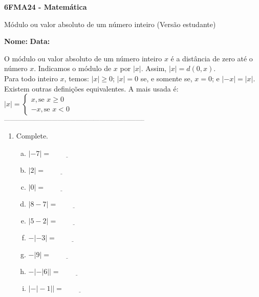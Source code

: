 \documentclass[a4paper,14pt]{article}
\begin{document}
	
	\noindent\textbf{6FMA24 - Matemática} 
	
	\begin{center}Módulo ou valor absoluto de um número inteiro (Versão estudante)
	\end{center}
	
	\noindent\textbf{Nome:} \underline{\hspace{10cm}}
	\noindent\textbf{Data:} \underline{\hspace{4cm}}
	
	
	\begin{multicols}{2}
		\noindent O módulo ou valor absoluto de um número inteiro $x$ é a distância de zero até o número $x$. Indicamos o módulo de $x$ por $|x|$. Assim, $|x| = d(0, x)$. \\
		Para todo inteiro $x$, temos: $|x| \geq 0$; $|x| = 0$ se, e somente se, $x = 0$; e $|-x| = |x|$. \\
		Existem outras definições equivalentes. A mais usada é: \\
		$|x| = \begin{cases}
			x, \text{se~} x \geq 0 \\
			-x, \text{se~} x < 0
		\end{cases}$ \\
		\noindent\textsubscript{-----------------------------------------------------------------------}
		\begin{enumerate} 
			\item Complete.
			\begin{enumerate}[a)]
				\item $|-7| = \underline{~~~~~~~~~~~~~~~~~~~~}$
				\item $|2| = \underline{~~~~~~~~~~~~~~~~~~~~}$
				\item $|0| = \underline{~~~~~~~~~~~~~~~~~~~~}$
				\item $|8 - 7| = \underline{~~~~~~~~~~~~~~~~~~~~}$
				\item $|5 - 2| = \underline{~~~~~~~~~~~~~~~~~~~~}$
				\item $-|-3| = \underline{~~~~~~~~~~~~~~~~~~~~}$
				\item $-|9| = \underline{~~~~~~~~~~~~~~~~~~~~}$
				\item $-|-|6|| = \underline{~~~~~~~~~~~~~~~~~~~~}$
				\item $|-|-1|| = \underline{~~~~~~~~~~~~~~~~~~~~}$

\end{enumerate}
\end{enumerate}
\end{multicols}
\end{document}
